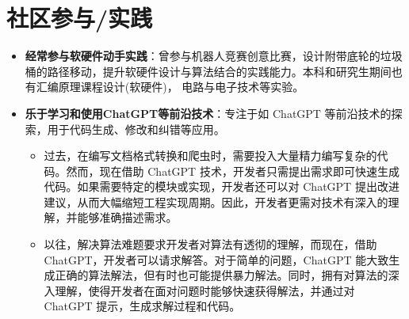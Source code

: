\documentclass{resume}
\begin{document}
\section{社区参与/实践}
\begin{itemize}[parsep=0.2ex]  
  \item \textbf{经常参与软硬件动手实践}：曾参与机器人竞赛创意比赛，设计附带底轮的垃圾桶的路径移动，提升软硬件设计与算法结合的实践能力。本科和研究生期间也有汇编原理课程设计(软硬件)， 电路与电子技术等实验。
  \item \textbf{乐于学习和使用ChatGPT等前沿技术}：专注于如 ChatGPT 等前沿技术的探索，用于代码生成、修改和纠错等应用。
  \begin{itemize}
	\item 过去，在编写文档格式转换和爬虫时，需要投入大量精力编写复杂的代码。然而，现在借助 ChatGPT 技术，开发者只需提出需求即可快速生成代码。如果需要特定的模块或实现，开发者还可以对 ChatGPT 提出改进建议，从而大幅缩短工程实现周期。因此，开发者更需对技术有深入的理解，并能够准确描述需求。
	\item 以往，解决算法难题要求开发者对算法有透彻的理解，而现在，借助 ChatGPT，开发者可以请求解答。对于简单的问题，ChatGPT 能大致生成正确的算法解法，但有时也可能提供暴力解法。同时，拥有对算法的深入理解，使得开发者在面对问题时能够快速获得解法，并通过对 ChatGPT 提示，生成求解过程和代码。
  \end{itemize}
  
\end{itemize}

%
%
\end{document}
